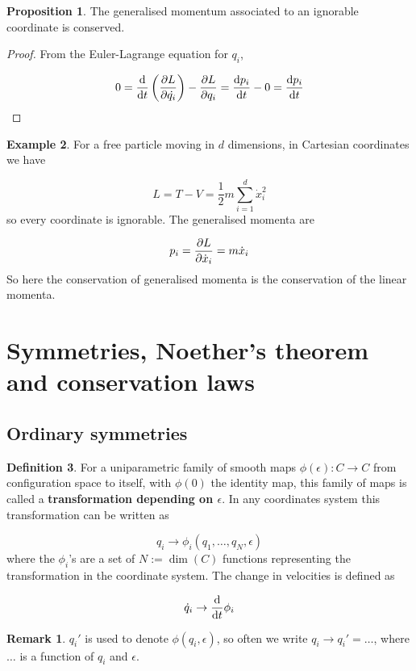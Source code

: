 \documentclass[12pt,a4paper]{article}
\theoremstyle{definition}
\newtheorem{definition}{Definition}[subsection]
\newtheorem{proposition}[definition]{Proposition}
\newtheorem{example}[definition]{Example}
\newtheorem*{remark}{Remark}
\begin{document}
\begin{proposition}\label{prop:generalisedIgnorableMomentumConserved}
	The generalised momentum associated to an ignorable coordinate is conserved.
\end{proposition}

\begin{proof}
	From the Euler-Lagrange equation for $q_i$,

	\[ 0 = \diff{}{t} \left( \diffp{L}{\dot{q_i}} \right) - \diffp{L}{q_i} = \diff{p_i}{t} - 0 = \diff{p_i}{t} \]
\end{proof}

\begin{example}
	For a free particle moving in $d$ dimensions, in Cartesian coordinates we have

	\[ L = T - V = \frac{1}{2} m \sum_{i = 1}^d \dot{x}_i^2 \]
	so every coordinate is ignorable. The generalised momenta are

	\[ p_i = \diffp{L}{\dot{x}_i} = m \dot{x}_i \]
	So here the conservation of generalised momenta is the conservation of the linear momenta.
\end{example}

\section{Symmetries, Noether's theorem and conservation laws}

\subsection{Ordinary symmetries}

\begin{definition}
	For a uniparametric family of smooth maps $\phi(\epsilon): C \rightarrow C$ from configuration space to itself, with $\phi(0)$ the identity map, this family of maps is called a \textbf{transformation depending on $\epsilon$}. In any coordinates system this transformation can be written as

	\[ q_i \rightarrow \phi_i(q_1, \dots, q_N, \epsilon) \]
	where the $\phi_i$'s are a set of $N := \dim(C)$ functions representing the transformation in the coordinate system. The change in velocities is defined as

	\[ \dot{q}_i \rightarrow \diff{}{t} \phi_i \]
\end{definition}

\begin{remark}
	$q_i'$ is used to denote $\phi(q_i, \epsilon)$, so often we write $q_i \rightarrow q_i' = \dots$, where $\dots$ is a function of $q_i$ and $\epsilon$.
\end{remark}
\end{document}
